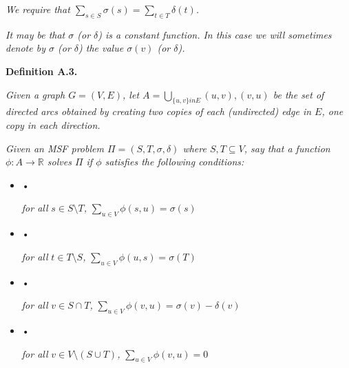 \emph{We require that
$\sum_{s\in S}\sigma(s)=\sum_{t\in T}\delta(t)$.}\par




\emph{It may be that $\sigma$ (or $\delta$) is a constant function. In this case we will sometimes denote by $\sigma$ (or $\delta$) the value $\sigma(v)$ (or $\delta$).}\par







\par\medskip\noindent\textbf{\textbf{Definition A.3}\textbf{.}}\par



\emph{Given a graph $G=(V,E)$, let $A=\bigcup_{\{u,v\}inE}{(u,v),(v,u)}$ be the set of directed arcs obtained by creating two copies of each (undirected) edge in $E$, one copy in each direction.}\par




\emph{Given an MSF problem $\Pi=(S,T,\sigma,\delta)$ where $S,T\subseteq V$, say that a function $\phi:A\rightarrow\mathbb{R}$ solves $\Pi$ if $\phi$ satisfies the following conditions:}\par




\begin{itemize}


\item[] • 


\emph{for all }$s\in S\setminus T$\emph{, }$\sum_{u\in V}\phi(s,u)=\sigma(s)$\par




\item[] • 


\emph{for all }$t\in T\setminus S$\emph{, }$\sum_{u\in V}\phi(u,s)=\sigma(T)$\par




\item[] • 


\emph{for all }$v\in S\cap T$\emph{, }$\sum_{u\in V}\phi(v,u)=\sigma(v)-\delta(v)$\par




\item[] • 


\emph{for all }$v\in V\setminus(S\cup T)$\emph{, }$\sum_{u\in V}\phi(v,u)=0$\par




\end{itemize}




